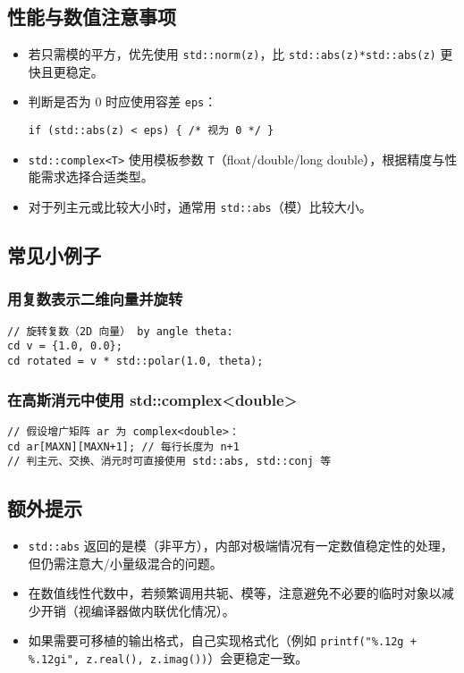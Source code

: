 \documentclass[a4paper]{report}
\begin{document}
\subsection*{性能与数值注意事项}
\begin{itemize}
  \item 若只需模的平方，优先使用 \verb|std::norm(z)|，比 \verb|std::abs(z)*std::abs(z)| 更快且更稳定。
  \item 判断是否为 0 时应使用容差 \verb|eps|：
\begin{verbatim}
if (std::abs(z) < eps) { /* 视为 0 */ }
\end{verbatim}
  \item \verb|std::complex<T>| 使用模板参数 \verb|T|（float/double/long double），根据精度与性能需求选择合适类型。
  \item 对于列主元或比较大小时，通常用 \verb|std::abs|（模）比较大小。
\end{itemize}

\subsection*{常见小例子}
\subsubsection*{用复数表示二维向量并旋转}
\begin{verbatim}
// 旋转复数（2D 向量） by angle theta:
cd v = {1.0, 0.0};
cd rotated = v * std::polar(1.0, theta);
\end{verbatim}

\subsubsection*{在高斯消元中使用 std::complex<double>}
\begin{verbatim}
// 假设增广矩阵 ar 为 complex<double>：
cd ar[MAXN][MAXN+1]; // 每行长度为 n+1
// 判主元、交换、消元时可直接使用 std::abs, std::conj 等
\end{verbatim}

\subsection*{额外提示}
\begin{itemize}
  \item \texttt{std::abs} 返回的是模（非平方），内部对极端情况有一定数值稳定性的处理，但仍需注意大/小量级混合的问题。
  \item 在数值线性代数中，若频繁调用共轭、模等，注意避免不必要的临时对象以减少开销（视编译器做内联优化情况）。
  \item 如果需要可移植的输出格式，自己实现格式化（例如 \verb|printf("%.12g + %.12gi", z.real(), z.imag())|）会更稳定一致。
\end{itemize}
\end{document}
